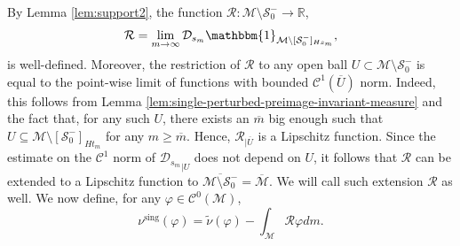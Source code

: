 \documentclass{amsart}
\numberwithin{equation}{section}
\newcommand\vf{\varphi}
\renewcommand{\ge}{\geqslant}
\newcommand\cC{{\mathcal C}}
\newcommand\cM{{\mathcal M}}
\newcommand\cR{{\mathcal R}}
\newcommand\cS{{\mathcal S}}
\newcommand\bR{{\mathbb R}}
\newcommand{\Deriv}{\mathcal D}
\newcommand{\sing}{\nu^{\text{sing}}}
\begin{document}
By Lemma \ref{lem:support2}, the function \(\mathcal R : \cM \setminus \cS_0^- \to \bR\), 
\begin{equation}\label{eq:R-def}
  \mathcal R=  \lim_{m \to \infty} \Deriv_{s_m}\mathbbm{1}_{\cM \setminus [\cS_0^-]_{Hs_m}},
\end{equation}
is well-defined. Moreover, the restriction of \(\cR\) to any open ball \(U \subset \cM \setminus \cS_0^{-}\) is equal to the point-wise limit of functions with bounded \(\cC^1(\overline U)\) norm. Indeed, this follows from Lemma \ref{lem:single-perturbed-preimage-invariant-measure} and the fact that, for any such \(U\), there exists an \(\overline m\) big enough such that \(U \subseteq \cM \setminus [\cS_0^-]_{Ht_m}\) for any \(m \ge \overline m\). Hence, \(\cR_{|\overline U}\) is a Lipschitz function. Since the estimate on the \(\cC^1\) norm of \({\Deriv_{s_m}}_{|U}\) does not depend on \(U\), it follows that \(\mathcal R\) can be extended to a Lipschitz function to \(\overline{\cM \setminus \cS_{0}^{-}} = \overline{\cM}\). We will call such extension \(\mathcal R\) as well. We now define, for any \(\vf \in \cC^0(\cM)\),
\begin{equation}\label{eq:sing-distribution-def}
  \sing (\vf) = \widetilde \nu(\vf) - \int_{\cM} \mathcal R \vf dm.
\end{equation}
\end{document}
